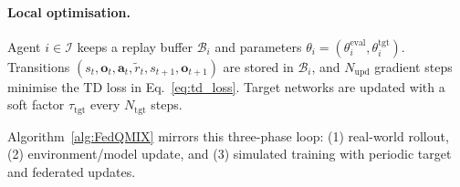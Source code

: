 \documentclass[drones,article,accept,pdftex,moreauthors]{Definitions/mdpi}
\begin{document}
\paragraph{Local optimisation.}
Agent $i\in\mathcal{I}$ keeps a replay buffer $\mathcal{B}_i$ and parameters
$\theta_i=(\theta_i^{\mathrm{eval}},\theta_i^{\mathrm{tgt}})$. Transitions
$(s_t,\mathbf{o}_t,\mathbf{a}_t,\tilde r_t,s_{t+1},\mathbf{o}_{t+1})$
are stored in $\mathcal{B}_i$, and $N_{\text{upd}}$ gradient steps minimise the TD loss in
Eq.~\eqref{eq:td_loss}. Target networks are updated with a soft factor
$\tau_{\text{tgt}}$ every $N_{\text{tgt}}$ steps.

Algorithm~\ref{alg:FedQMIX} mirrors this three-phase loop:
(1) real-world rollout,
(2) environment/model update, and
(3) simulated training with periodic target and federated updates.
\end{document}
